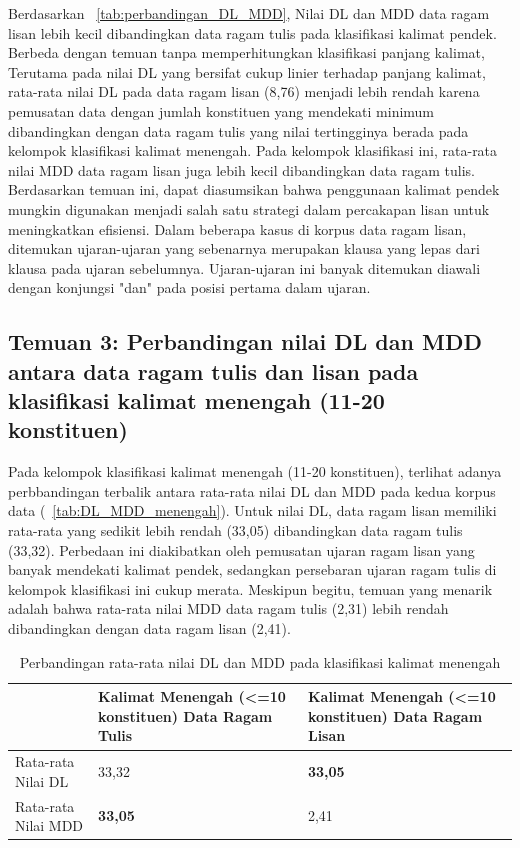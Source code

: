 Berdasarkan \tab~\ref{tab:perbandingan_DL_MDD}, Nilai DL dan MDD data ragam lisan lebih kecil dibandingkan data ragam tulis pada klasifikasi kalimat pendek. Berbeda dengan temuan tanpa memperhitungkan klasifikasi panjang kalimat, Terutama pada nilai DL yang bersifat cukup linier terhadap panjang kalimat, rata-rata nilai DL pada data ragam lisan (8,76) menjadi lebih rendah karena pemusatan data dengan jumlah konstituen yang mendekati minimum dibandingkan dengan data ragam tulis yang nilai tertingginya berada pada kelompok klasifikasi kalimat menengah. Pada kelompok klasifikasi ini, rata-rata nilai MDD data ragam lisan juga lebih kecil dibandingkan data ragam tulis. Berdasarkan temuan ini, dapat diasumsikan bahwa penggunaan kalimat pendek mungkin digunakan menjadi salah satu strategi dalam percakapan lisan untuk meningkatkan efisiensi. Dalam beberapa kasus di korpus data ragam lisan, ditemukan ujaran-ujaran yang sebenarnya merupakan klausa yang lepas dari klausa pada ujaran sebelumnya. Ujaran-ujaran ini banyak ditemukan diawali dengan konjungsi "dan" pada posisi pertama dalam ujaran. 

\subsection{Temuan 3: Perbandingan nilai DL dan MDD antara data ragam tulis dan lisan pada klasifikasi kalimat menengah (11-20 konstituen)}
Pada kelompok klasifikasi kalimat menengah (11-20 konstituen), terlihat adanya perbbandingan terbalik antara rata-rata nilai DL dan MDD pada kedua korpus data (\tab~\ref{tab:DL_MDD_menengah}). Untuk nilai DL, data ragam lisan memiliki rata-rata yang sedikit lebih rendah (33,05) dibandingkan data ragam tulis (33,32). Perbedaan ini diakibatkan oleh pemusatan ujaran ragam lisan yang banyak mendekati kalimat pendek, sedangkan persebaran ujaran ragam tulis di kelompok klasifikasi ini cukup merata. Meskipun begitu, temuan yang menarik adalah bahwa rata-rata nilai MDD data ragam tulis (2,31) lebih rendah dibandingkan dengan data ragam lisan (2,41). 

\begin{table}
\begin{center}
\label{table:DL_MDD_menengah}
 \caption{Perbandingan rata-rata nilai DL dan MDD pada klasifikasi kalimat menengah}  \begin{tabular}{ |p{4cm} | p{4cm} | p{4cm} |}
    \hline
 & Kalimat Menengah \newline (\textless =10 konstituen) \newline Data Ragam Tulis & Kalimat Menengah \newline (\textless =10 konstituen) \newline Data Ragam Lisan \\ \hline
 Rata-rata Nilai DL & 33,32 & \textbf{33,05} \\ \hline
 Rata-rata Nilai MDD & \textbf{33,05} & 2,41 \\ \hline
   \end{tabular}
\end{center}
\end{table}


